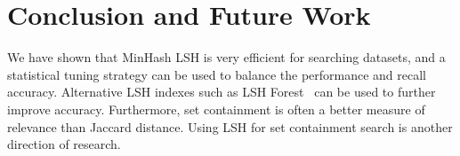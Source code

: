 \documentclass{sig-alternate}
\begin{document}
\section{Conclusion and Future Work}
We have shown that MinHash LSH is very efficient for searching datasets,
and a statistical tuning strategy can be used to balance the performance 
and recall accuracy.
Alternative LSH indexes such as LSH Forest~\cite{Bawa:WWW:2005} can be used to further improve
accuracy.
Furthermore, set containment is often a better measure of relevance than 
Jaccard distance. Using LSH for set containment search is another 
direction of research.
%

%
%
\end{document}
